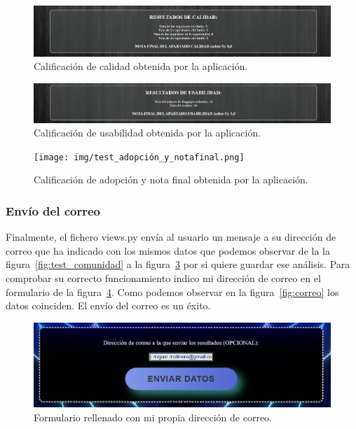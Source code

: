 \documentclass[a4paper, 12pt]{book}
\begin{document}
\begin{figure}
    \centering
    \includegraphics[width=1\textwidth, keepaspectratio]{img/test_calidad.png}
    \caption{Calificación de calidad obtenida por la aplicación.}\label{fig:test_calidad}
\end{figure}

\begin{figure}
    \centering
    \includegraphics[width=1\textwidth, keepaspectratio]{img/test_usabilidad.png}
    \caption{Calificación de usabilidad obtenida por la aplicación.}\label{fig:test_usabilidad}
\end{figure}

\begin{figure}
    \centering
    \texttt{[image: img/test\_adopción\_y\_notafinal.png]}
    \caption{Calificación de adopción y nota final obtenida por la aplicación.}\label{fig:test_adopción_y_notafinal}
\end{figure}

\subsubsection{Envío del correo}

Finalmente, el fichero views.py envía al usuario un mensaje a su dirección de correo que ha indicado con los mismos datos que podemos observar de la la figura~\ref{fig:test_comunidad} a la figura~\ref{fig:test_adopción_y_notafinal} por si quiere guardar ese análisis. Para comprobar su correcto funcionamiento indico mi dirección de correo en el formulario de la figura~\ref{fig:envio_correo}. Como podemos observar en la figura~\ref{fig:correo} los datos coinciden. El envío del correo es un éxito.

\begin{figure}
    \centering
    \includegraphics[width=1\textwidth, keepaspectratio]{img/envio_correo.png}
    \caption{Formulario rellenado con mi propia dirección de correo.}\label{fig:envio_correo}
\end{figure}
\end{document}
